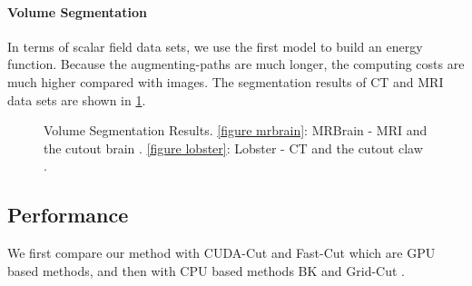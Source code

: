 \paragraph*{\textbf{Volume Segmentation}} In terms of scalar field data sets, we use the first model to build an energy function.
Because the augmenting-paths are much longer, the computing costs are much higher compared with images.
The segmentation results of CT
\footnotemark[7] and MRI
\footnotemark[8] data sets are shown in \figurename \ref{figure volume segmentation}.

\begin{figure}
\centering
{}
\caption{Volume Segmentation Results.
\ref{figure mrbrain}: MRBrain - MRI and the cutout brain \protect\footnotemark[7].
\ref{figure lobster}: Lobster - CT and the cutout claw \protect\footnotemark[8].
}
\label{figure volume segmentation}
\end{figure}

\subsection{Performance}

We first compare our method with CUDA-Cut \cite{08VN} and Fast-Cut \cite{09S, 11W} which are GPU based methods, and then with CPU based methods BK \cite{04BK} and Grid-Cut \cite{12JSH}.

